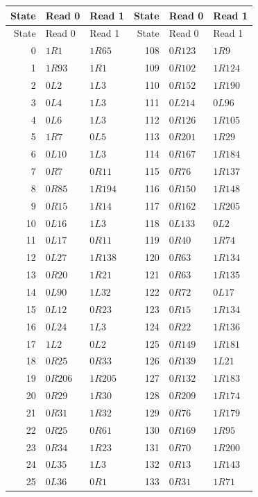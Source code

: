 \small\renewcommand{\arraystretch}{0.94}
\begin{longtable}{rll@{\qquad}rll}
\toprule State & Read 0 & Read 1 & State & Read 0 & Read 1\\\midrule
\endfirsthead
\toprule State & Read 0 & Read 1 & State & Read 0 & Read 1\\\midrule
\endhead
0 & $1R1$ & $1R65$ & 108 & $0R123$ & $1R9$\\
1 & $1R93$ & $1R1$ & 109 & $0R102$ & $1R124$\\
2 & $0L2$ & $1L3$ & 110 & $0R152$ & $1R190$\\
3 & $0L4$ & $1L3$ & 111 & $0L214$ & $0L96$\\
4 & $0L6$ & $1L3$ & 112 & $0R126$ & $1R105$\\
5 & $1R7$ & $0L5$ & 113 & $0R201$ & $1R29$\\
6 & $0L10$ & $1L3$ & 114 & $0R167$ & $1R184$\\
7 & $0R7$ & $0R11$ & 115 & $0R76$ & $1R137$\\
8 & $0R85$ & $1R194$ & 116 & $0R150$ & $1R148$\\
9 & $0R15$ & $1R14$ & 117 & $0R162$ & $1R205$\\
10 & $0L16$ & $1L3$ & 118 & $0L133$ & $0L2$\\
11 & $0L17$ & $0R11$ & 119 & $0R40$ & $1R74$\\
12 & $0L27$ & $1R138$ & 120 & $0R63$ & $1R134$\\
13 & $0R20$ & $1R21$ & 121 & $0R63$ & $1R135$\\
14 & $0L90$ & $1L32$ & 122 & $0R72$ & $0L17$\\
15 & $0L12$ & $0R23$ & 123 & $0R15$ & $1R134$\\
16 & $0L24$ & $1L3$ & 124 & $0R22$ & $1R136$\\
17 & $1L2$ & $0L2$ & 125 & $0R149$ & $1R181$\\
18 & $0R25$ & $0R33$ & 126 & $0R139$ & $1L21$\\
19 & $0R206$ & $1R205$ & 127 & $0R132$ & $1R183$\\
20 & $0R29$ & $1R30$ & 128 & $0R209$ & $1R174$\\
21 & $0R31$ & $1R32$ & 129 & $0R76$ & $1R179$\\
22 & $0R25$ & $0R61$ & 130 & $0R169$ & $1R95$\\
23 & $0R34$ & $1R23$ & 131 & $0R70$ & $1R200$\\
24 & $0L35$ & $1L3$ & 132 & $0R13$ & $1R143$\\
25 & $0L36$ & $0R1$ & 133 & $0R31$ & $1R71$\\

\end{longtable}
